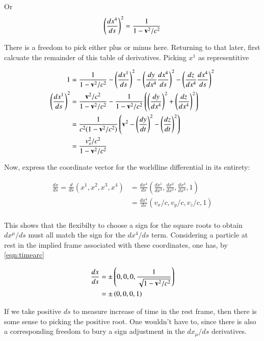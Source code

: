 \documentclass{article}
\begin{document}
Or
\begin{align}\label{eqn:timearc}
\left(\frac{dx^4}{ds}\right)^2 = \frac{1}{1 - \mathbf{v}^2/c^2 } \\
\end{align}

There is a freedom to pick either plus or minus here.  Returning to that later, first 
calcuate the remainder of this table of derivatives.  Picking $x^1$ as representitive

\begin{align*}
1 &= \frac{1}{1 - \mathbf{v}^2/c^2 } 
- \left(\frac{dx^1}{ds}\right)^2
- \left( \frac{dy}{dx^4} \frac{dx^4}{ds} \right)^2
- \left( \frac{dz}{dx^4} \frac{dx^4}{ds} \right)^2 \\
\left(\frac{dx^1}{ds}\right)^2
&= \frac{\mathbf{v}^2/c^2 }{1 - \mathbf{v}^2/c^2 } 
-\frac{1}{1 - \mathbf{v}^2/c^2 } \left( \left( \frac{dy}{dx^4} \right)^2 + \left( \frac{dz}{dx^4} \right)^2 \right) \\
&= \frac{1}{c^2 (1 - \mathbf{v}^2/c^2) } \left( \mathbf{v}^2 - \left( \frac{dy}{dt} \right)^2 - \left( \frac{dz}{dt} \right)^2 \right) \\
&= \frac{v_x^2/c^2}{1 - \mathbf{v}^2/c^2}
\end{align*}

Now, express the coordinate vector for the worldline differential in its entirety:

\begin{align*}
\frac{dx}{ds} =
\frac{d}{ds}(x^1, x^2, x^3, x^4)
&= \frac{dx^4}{ds} \left( \frac{dx^1}{dx^4}, \frac{dx^2}{dx^4}, \frac{dx^3}{dx^4}, 1 \right) \\
&= \frac{dx^4}{ds} ( v_x/c, v_y/c, v_z/c, 1) \\
\end{align*}

This shows that the flexibilty to choose a sign for the square roots to obtain $dx^\mu/ds$ must all match the sign for the $dx^4/ds$ term.  Considering a particle at rest in the implied frame associated with these coordinates, one has, by \ref{eqn:timearc}

\begin{align*}
\frac{dx}{ds} 
&= \pm \left(0, 0, 0, \frac{1}{\sqrt{1 - \mathbf{v}^2/c^2}} \right) \\
&= \pm \left(0, 0, 0, 1 \right) \\
\end{align*}

If we take positive $ds$ to measure increase of time in the rest frame, then there is some sense to picking the positive root.  One
wouldn't have to, since there is also a corresponding freedom to bury a sign adjustment in the $dx_\mu/ds$ derivatives.



\end{document}
